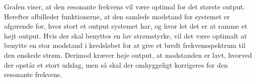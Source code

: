 Grafen viser, at den resonante frekvens vil være optimal for det største output. Herefter afbilleder funktionerne, at den samlede modstand for systemet er afgørende for, hvor stort et output systemet har, og hvor let det er at ramme et højt output. Hvis der skal benyttes en lav strømstyrke, vil det være optimalt at benytte en stor modstand i kredsløbet for at give et bredt frekvensspektrum til den ønskede strøm. Derimod kræver høje output, at modstanden er lavt, hvorved der opstår et stort udslag, men så skal der omhyggeligt korrigeres for den resonante frekvens. \cite{fysikbog}